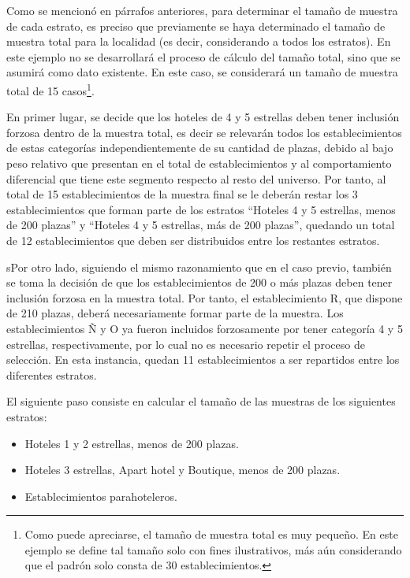 \documentclass[
]{book}
\begin{document}
Como se mencionó en párrafos anteriores, para determinar el tamaño de muestra de cada estrato, es preciso que previamente se haya determinado el tamaño de muestra total para la localidad (es decir, considerando a todos los estratos). En este ejemplo no se desarrollará el proceso de cálculo del tamaño total, sino que se asumirá como dato existente. En este caso, se considerará un tamaño de muestra total de 15 casos\footnote{Como puede apreciarse, el tamaño de muestra total es muy pequeño. En este ejemplo se define tal tamaño solo con fines ilustrativos, más aún considerando que el padrón solo consta de 30 establecimientos.}.

En primer lugar, se decide que los hoteles de 4 y 5 estrellas deben tener inclusión forzosa dentro de la muestra total, es decir se relevarán todos los establecimientos de estas categorías independientemente de su cantidad de plazas, debido al bajo peso relativo que presentan en el total de establecimientos y al comportamiento diferencial que tiene este segmento respecto al resto del universo. Por tanto, al total de 15 establecimientos de la muestra final se le deberán restar los 3 establecimientos que forman parte de los estratos ``Hoteles 4 y 5 estrellas, menos de 200 plazas'' y ``Hoteles 4 y 5 estrellas, más de 200 plazas'', quedando un total de 12 establecimientos que deben ser distribuidos entre los restantes estratos.

sPor otro lado, siguiendo el mismo razonamiento que en el caso previo, también se toma la decisión de que los establecimientos de 200 o más plazas deben tener inclusión forzosa en la muestra total. Por tanto, el establecimiento R, que dispone de 210 plazas, deberá necesariamente formar parte de la muestra. Los establecimientos Ñ y O ya fueron incluidos forzosamente por tener categoría 4 y 5 estrellas, respectivamente, por lo cual no es necesario repetir el proceso de selección. En esta instancia, quedan 11 establecimientos a ser repartidos entre los diferentes estratos.

El siguiente paso consiste en calcular el tamaño de las muestras de los siguientes estratos:

\begin{itemize}
\item
  Hoteles 1 y 2 estrellas, menos de 200 plazas.
\item
  Hoteles 3 estrellas, Apart hotel y Boutique, menos de 200 plazas.
\item
  Establecimientos parahoteleros.
\end{itemize}
\end{document}

